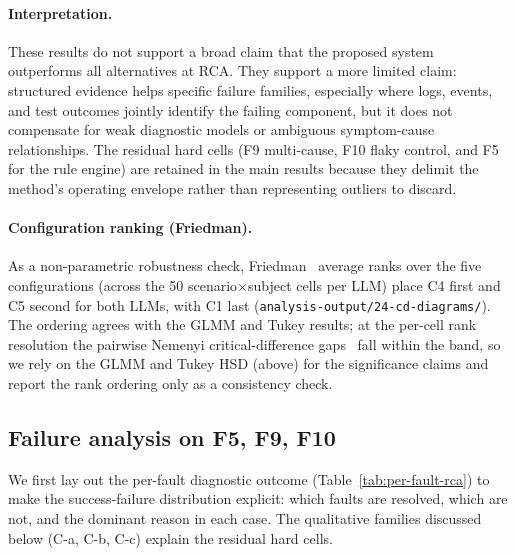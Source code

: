 \documentclass[sigconf, nonacm=true, anonymous=false, review=false]{acmart}
\newcommand{\artifactname}[1]{\nolinkurl{#1}}
\newcommand{\Cn}[1]{C#1\xspace}
\newcommand{\fn}[1]{F#1\xspace}
\begin{document}
\paragraph{Interpretation.}
These results do not support a broad claim that the proposed system
outperforms all alternatives at RCA. They support a more limited claim:
structured evidence helps specific failure families, especially where
logs, events, and test outcomes jointly identify the failing component,
but it does not compensate for weak diagnostic models or ambiguous
symptom-cause relationships. The residual hard cells (\fn{9} multi-cause,
\fn{10} flaky control, and \fn{5} for the rule engine) are retained in
the main results because they delimit the method's operating envelope
rather than representing outliers to discard.

\paragraph{Configuration ranking (Friedman).} As a non-parametric
robustness check, Friedman~\cite{friedman1937} average ranks over the
five configurations (across the 50 scenario$\times$subject cells per
LLM) place \Cn{4} first and \Cn{5} second for both LLMs, with \Cn{1}
last (\artifactname{analysis-output/24-cd-diagrams/}). The ordering
agrees with the GLMM and Tukey results; at the per-cell rank resolution
the pairwise Nemenyi critical-difference gaps~\cite{demsar_2006} fall
within the band, so we rely on the GLMM and Tukey HSD (above) for the
significance claims and report the rank ordering only as a consistency
check.

\subsection{Failure analysis on \fn{5}, \fn{9}, \fn{10}}
\label{sec:failure-analysis}

We first lay out the per-fault diagnostic outcome
(Table~\ref{tab:per-fault-rca}) to make the success-failure
distribution explicit: which faults are resolved, which are not, and
the dominant reason in each case. The qualitative families discussed
below (C-a, C-b, C-c) explain the residual hard cells.
\end{document}
